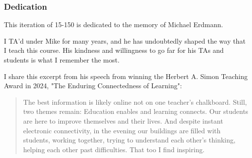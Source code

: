 \documentclass[aspectratio=169, handout]{beamer}
\begin{document}
\begin{frame}[fragile]
  \frametitle{Dedication}

  This iteration of 15-150 is dedicated to the memory of Michael Erdmann.

  \pause
  \vspace{\fill}

  I TA'd under Mike for many years, and he has undoubtedly shaped the
  way that I teach this course. His kindness and willingness to go
  far for his TAs and students is what I remember the most.

  \pause
  \vspace{\fill}

  I share this excerpt from his speech from winning the Herbert A. Simon
  Teaching Award in 2024, "The Enduring Connectedness of Learning":

  \pause
  \vspace{5pt}

  \begin{quote}
    The best information is likely online not on one teacher's chalkboard.
    Still, two themes remain: Education enables and learning connects.
    Our students are here to improve themselves and their lives.
    And despite instant electronic connectivity, in the evening our buildings
    are filled with students, working together, trying to understand each
    other's thinking, helping each other past difficulties. That too I find
    inspiring.
  \end{quote}
\end{frame}
\end{document}
